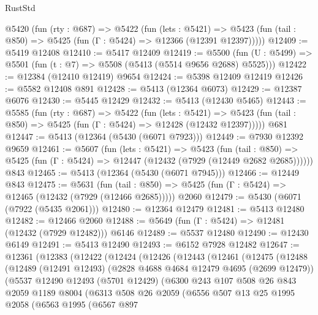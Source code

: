 \begin{lexlean}{RustStd}
\begin{coremodule}
  @5420
    (fun (rty : @687) =>
    @5422
      (fun (lets : @5421) =>
      @5423 (fun (tail : @850) => @5425 (fun (Γ : @5424) => @12366 (@12391 @12397)))))
@12409 := @5419 @12408
@12410 := @5417 @12409
@12419 := @5500 (fun (U : @5499) => @5501 (fun (t : @7) => @5508 (@5413 (@5514 @9656 @2688) @5525)))
@12422 := @12384 (@12410 @12419) @9654
@12424 := @5398 @12409 @12419
@12426 := @5582 @12408 @891
@12428 := @5413 (@12364 @6073)
@12429 := @12387 @6076
@12430 := @5445 @12429
@12432 := @5413 (@12430 @5465)
@12443 := @5585
    (fun (rty : @687) =>
    @5422
      (fun (lets : @5421) =>
      @5423 (fun (tail : @850) => @5425 (fun (Γ : @5424) => @12428 (@12432 @12397)))))
    @681
@12447 := @5413 (@12364 (@5430 (@6071 @7923)))
@12449 := @7930 @12392 @9659
@12461 := @5607
    (fun (lets : @5421) =>
    @5423
      (fun (tail : @850) =>
      @5425 (fun (Γ : @5424) => @12447 (@12432 (@7929 (@12449 @2682 @2685))))))
    @843
@12465 := @5413 (@12364 (@5430 (@6071 @7945)))
@12466 := @12449 @843
@12475 := @5631
    (fun (tail : @850) => @5425 (fun (Γ : @5424) => @12465 (@12432 (@7929 (@12466 @2685)))))
    @2060
@12479 := @5430 (@6071 (@7922 (@5435 @2061)))
@12480 := @12364 @12479
@12481 := @5413 @12480
@12482 := @12466 @2060
@12488 := @5649 (fun (Γ : @5424) => @12481 (@12432 (@7929 @12482))) @6146
@12489 := @5537 @12480
@12490 := @12430 @6149
@12491 := @5413 @12490
@12493 := @6152 @7928 @12482
@12647 := @12361
    (@12383
      (@12422
        (@12424
          (@12426
            (@12443
              (@12461
                (@12475
                  (@12488
                    (@12489
                      (@12491 @12493)
                      (@2828 @4688 @4684 @12479 @4695 (@2699 @12479))
                      (@5537
                        @12490
                        @12493
                        (@5701 @12429)
                        (@6300
                          @243
                          @107
                          @508
                          @26
                          @843
                          @2059
                          @1189
                          @8004
                          (@6313
                            @508
                            @26
                            @2059
                            (@6556
                              @507
                              @13
                              @25
                              @1995
                              @2058
                              (@6563
                                @1995
                                (@6567
                                  @897

\end{coremodule}
\end{lexlean}
